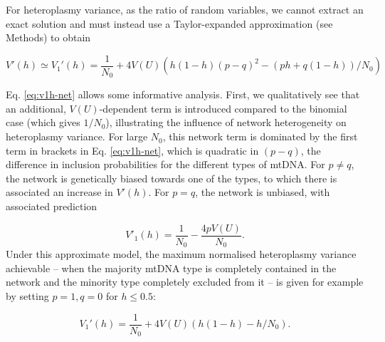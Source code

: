 \documentclass{article}
\newcommand{\be}{\begin{equation}}
\newcommand{\ee}{\end{equation}}
\begin{document}
For heteroplasmy variance, as the ratio of random variables, we cannot extract an exact solution and must instead use a Taylor-expanded approximation (see Methods) to obtain 

\be\label{eq:v1h-net}
    V'(h) \simeq V_1'(h)= \frac{1}{N_0} + 4 V(U) \left( h(1-h) (p-q)^2 - (p h + q(1-h))/N_0 \right)
\ee

Eq. \ref{eq:v1h-net} allows some informative analysis. First, we qualitatively see that an additional, $V(U)$-dependent term is introduced compared to the binomial case (which gives $1/N_0$), illustrating the influence of network heterogeneity on heteroplasmy variance. For large $N_0$, this network term is dominated by the first term in brackets in Eq. \ref{eq:v1h-net}, which is quadratic in $(p-q)$, the difference in inclusion probabilities for the different types of mtDNA. For $p\neq q$, the network is genetically biased towards one of the types, to which there is associated an increase in $V'(h)$. For $p=q$, the network is unbiased, with associated prediction

\begin{equation}
V'_1(h) = \frac{1}{N_0} - \frac{4 p V(U)}{N_0}.
\end{equation}
Under this approximate model, the maximum normalised heteroplasmy variance achievable -- when the majority mtDNA type is completely contained in the network and the minority type completely excluded from it -- is given for example by setting $p = 1, q= 0$ for $h \leq 0.5$:

\begin{equation}\label{eq:symm-max-vh}
   V_1'(h)=\frac{1}{N_0} + 4 V(U) \left( h(1-h) - h/N_0 \right).
\end{equation}
\end{document}
